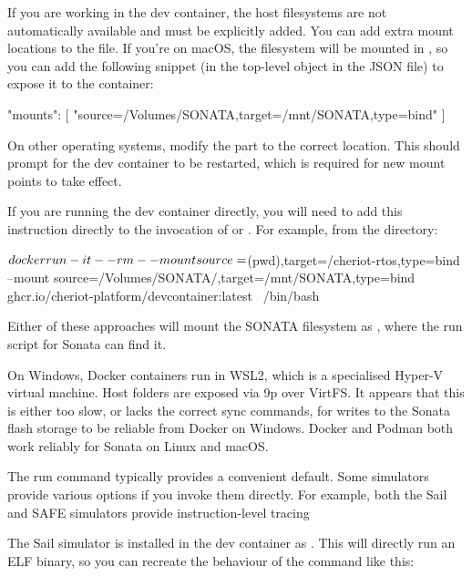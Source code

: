If you are working in the dev container, the host filesystems are not automatically available and must be explicitly added.
You can add extra mount locations to the  file.
If you're on macOS, the  filesystem will be mounted in , so you can add the following snippet (in the top-level object in the JSON file) to expose it to the container:

\begin{jsonsnippet}
  "mounts": [
    "source=/Volumes/SONATA,target=/mnt/SONATA,type=bind"
  ]
\end{jsonsnippet}

On other operating systems, modify the  part to the correct location.
This should prompt for the dev container to be restarted, which is required for new mount points to take effect.

If you are running the dev container directly, you will need to add this instruction directly to the invocation of  or .
For example, from the  directory:

\begin{console}
$ docker run -it --rm \\
	--mount source=$(pwd),target=/cheriot-rtos,type=bind \\
	--mount source=/Volumes/SONATA/,target=/mnt/SONATA,type=bind \\
	ghcr.io/cheriot-platform/devcontainer:latest \
	/bin/bash
\end{console}

Either of these approaches will mount the SONATA filesystem as , where the run script for Sonata can find it.

\begin{caution}
	On Windows, Docker containers run in WSL2, which is a specialised Hyper-V virtual machine.
	Host folders are exposed via 9p over VirtFS.
	It appears that this is either too slow, or lacks the correct sync commands, for writes to the Sonata flash storage to be reliable from Docker on Windows.
	Docker and Podman both work reliably for Sonata on Linux and macOS.
\end{caution}

The run command typically provides a convenient default.
Some simulators provide various options if you invoke them directly.
For example, both the Sail and SAFE simulators provide instruction-level tracing

The Sail simulator is installed in the dev container as .
This will directly run an ELF binary, so you can recreate the behaviour of the  command like this:

